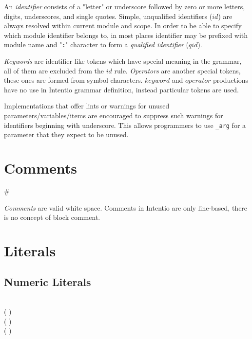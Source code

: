 An \emph{identifier} consists of a "letter" or underscore followed by zero or more letters, digits, underscores, and single quotes. Simple, unqualified identifiers (\(id\)) are always resolved within current module and scope. In order to be able to specify which module identifier belongs to, in most places identifier may be prefixed with module name and "\texttt{:}" character to form a \emph{qualified identifier} (\(qid\)).

\emph{Keywords} are identifier-like tokens which have special meaning in the grammar, all of them are excluded from the \(id\) rule. \emph{Operators} are another special tokens, these ones are formed from symbol characters. \(keyword\) and \(operator\) productions have no use in Intentio grammar definition, instead particular tokens are used.

Implementations that offer lints or warnings for unused parameters/variables/items are encouraged to suppress such warnings for identifiers beginning with underscore. This allows programmers to use \texttt{\_arg} for a parameter that they expect to be unused.

\section{Comments}

\begin{bnf}
   \eq \# \  \ 
\end{bnf}

\emph{Comments} are valid white space. Comments in Intentio are only line-based, there is no concept of block comment.

\section{Literals}

\begin{bnf}
   \eq {} \gor {} \gor {}
\end{bnf}

\subsection{Numeric Literals}

\begin{bnf}
       \eq {} \  \\
        \eq ( \gor {}) \  \  \\
         \eq ( \gor {}) \  \  \\
   \eq ( \gor {}) \  \  \\
  \\
   \eq {} \gor {} \gor {} \gor {} \\
\end{bnf}

